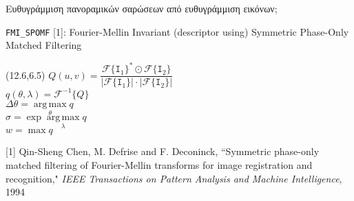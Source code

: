 \begin{frame}{Ευθυγράμμιση πανοραμικών σαρώσεων από ευθυγράμμιση εικόνων;}

  {\small
  \texttt{FMI\_SPOMF} [1]: Fourier-Mellin Invariant (descriptor using) Symmetric Phase-Only Matched Filtering
  }

  \begin{figure}
    
  \end{figure}


\begin{textblock}{14}(12.6,6.5)
{\tiny $Q(u,v) = \dfrac{\mathcal{F}\{\texttt{I}_1\}^{\ast} \odot \mathcal{F}\{\texttt{I}_2\}}{|\mathcal{F}\{\texttt{I}_1\}| \cdot |\mathcal{F}\{\texttt{I}_2\}|}$}\\
{\tiny $q(\theta, \lambda) = \mathcal{F}^{-1}\{Q\}$}\\
{\tiny $\Delta \theta = \operatorname*{arg\,max}\limits_\theta q$}\\
{\tiny $\sigma = \exp{\operatorname*{arg\,max}\limits_\lambda q}$}\\
{\tiny $w = \max q$}
\end{textblock}

  \placebottom
  \tiny
  [1] Qin-Sheng Chen, M. Defrise and F. Deconinck, ``Symmetric phase-only matched filtering of Fourier-Mellin transforms for image registration and recognition," \textit{IEEE Transactions on Pattern Analysis and Machine Intelligence}, 1994




\end{frame}
